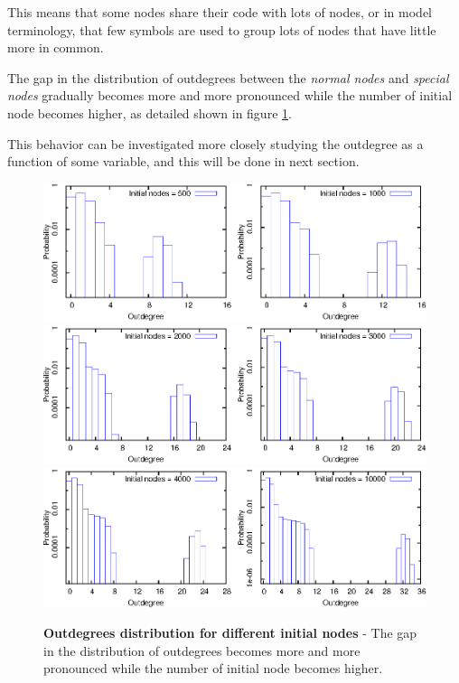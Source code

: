 This means that some nodes share their code with lots of nodes, or in model terminology, that few symbols are used to group lots of nodes that have little more in common.

The gap in the distribution of outdegrees between the \textit{normal nodes} and \textit{special nodes} gradually becomes more and more pronounced while the number of initial node becomes higher, as detailed shown in figure \ref{TEoutdeg}.

This behavior can be investigated more closely studying the outdegree as a function of some variable, and this will be done in next section.

\begin{figure}[p]%
\includegraphics[width=\textwidth,draft=false]{grafici/TEXoutdeg1.eps}
\includegraphics[width=\textwidth,draft=false]{grafici/TEXoutdeg2.eps}
\includegraphics[width=\textwidth,draft=false]{grafici/TEXoutdeg3.eps}
\caption{\label{TEoutdeg} \footnotesize\textbf{Outdegrees distribution for different initial nodes} - The gap in the distribution of outdegrees becomes more and more pronounced while the number of initial node becomes higher.}
\end{figure}

